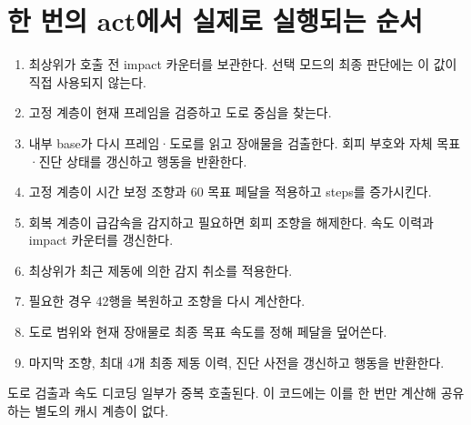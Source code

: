 \documentclass[11pt,a4paper]{article}
\begin{document}
\section{한 번의 act에서 실제로 실행되는 순서}
\begin{enumerate}
\item 최상위가 호출 전 impact 카운터를 보관한다. 선택 모드의 최종 판단에는 이 값이 직접 사용되지 않는다.
\item 고정 계층이 현재 프레임을 검증하고 도로 중심을 찾는다.
\item 내부 base가 다시 프레임·도로를 읽고 장애물을 검출한다. 회피 부호와 자체 목표·진단 상태를 갱신하고 행동을 반환한다.
\item 고정 계층이 시간 보정 조향과 60 목표 페달을 적용하고 steps를 증가시킨다.
\item 회복 계층이 급감속을 감지하고 필요하면 회피 조향을 해제한다. 속도 이력과 impact 카운터를 갱신한다.
\item 최상위가 최근 제동에 의한 감지 취소를 적용한다.
\item 필요한 경우 42행을 복원하고 조향을 다시 계산한다.
\item 도로 범위와 현재 장애물로 최종 목표 속도를 정해 페달을 덮어쓴다.
\item 마지막 조향, 최대 4개 최종 제동 이력, 진단 사전을 갱신하고 행동을 반환한다.
\end{enumerate}
도로 검출과 속도 디코딩 일부가 중복 호출된다. 이 코드에는 이를 한 번만 계산해 공유하는 별도의 캐시 계층이 없다.
\end{document}
